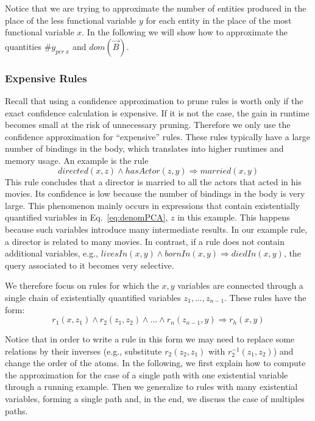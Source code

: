 Notice that we are trying to approximate the number of entities produced in the place of the less functional variable $y$ for each entity in the place of the most functional variable $x$.
In the following we will show how to approximate the quantities $\#y_{per\; x}$ and $dom(\vec{B})$.


\subsubsection{Expensive Rules}\label{sec:expensive_rules}

Recall that using a confidence approximation to prune rules is worth only if the exact confidence calculation is expensive. 
If it is not the case, the gain in runtime becomes small at the risk of unnecessary pruning.
Therefore we only use the confidence approximation for ``expensive'' rules. 
These rules typically have a large number of bindings in the body, which translates into 
higher runtimes and memory usage. An example is the rule 
\[
 directed(x,z) \wedge hasActor(z,y) \Rightarrow married(x,y)
\]
This rule concludes that a director is married to all the actors that acted in his movies. Its
confidence is low because the number of bindings in the body is very large. 
This phenomenon mainly occurs in expressions that contain existentially quantified variables in Eq.~\ref{eq:denomPCA}, 
$z$ in this example. This happens because such variables introduce many intermediate results. In our example
rule, a director is related to many movies. In contrast, if a rule does not contain additional variables, 
e.g., $livesIn(x,y)\wedge bornIn(x,y)\Rightarrow diedIn(x,y)$, the query associated to it becomes very selective.

We therefore focus on rules for which the $x,y$ variables are connected through a single 
chain of existentially quantified variables $z_1,..., z_{n-1}$. These rules have the form:
$$
  r_1(x,z_1) \wedge r_2(z_1,z_2) \wedge ... \wedge r_n(z_{n-1},y) \Rightarrow r_h(x,y)
$$

Notice that in order to write a rule in this form we may need to replace some relations by their inverses
(e.g., substitute $r_2(z_2,z_1)$ with $r_2^{-1}(z_1,z_2)$)
and change the order of the atoms.
In the following, we first explain how to compute the approximation for the case of a single 
path with one existential variable through a running example.
Then we generalize to rules with many existential variables, forming a single path and, 
in the end, we discuss the case of multiples paths.

